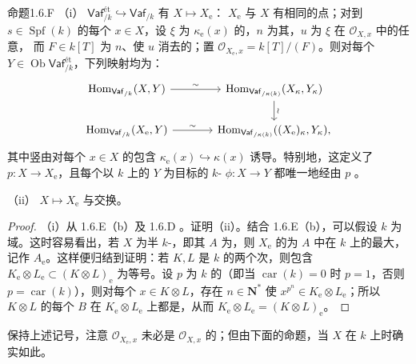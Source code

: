 \begin{SGAresult}{命题}{1.6.F}
（i） $\mathsf{Vaf}^{\text{ét}}_{/k}\hookrightarrow\mathsf{Vaf}_{/k}$ 有 $X\mapsto X_{\mathrm e}$： $X_{\mathrm e}$ 与 $X$ 有相同的点；对到 $s\in\operatorname{Spf}(k)$ 的每个 $x\in X$，设 $\xi$ 为 $\kappa_{\mathrm e}(x)$ 的，$n$ 为其，$u$ 为 $\xi$ 在 $\mathcal O_{X,x}$ 中的任意，
而 $F\in k[T]$ 为 $n$、使 $u$ 消去的；置 $\mathcal O_{X_{\mathrm e},x}=k[T]/(F)$。则对每个 $Y\in\operatorname{Ob}\mathsf{Vaf}^{\text{ét}}_{/k}$，下列映射均为：
\[
\begin{tikzcd}[column sep=large]
 \operatorname{Hom}_{\mathsf{Vaf}_{/k}}(X,Y)\arrow[r,"\sim"]
 &\operatorname{Hom}_{\mathsf{Vaf}_{/\kappa(k)}}(X_\kappa,Y_\kappa)\arrow[d,"\wr"]\\
 \operatorname{Hom}_{\mathsf{Vaf}_{/k}}(X_{\mathrm e},Y)\arrow[r,"\sim"]
 &\operatorname{Hom}_{\mathsf{Vaf}_{/\kappa(k)}}((X_{\mathrm e})_\kappa,Y_\kappa),
\end{tikzcd}
\]
其中竖由对每个 $x\in X$ 的包含 $\kappa_{\mathrm e}(x)\hookrightarrow\kappa(x)$ 诱导。特别地，这定义了 $p:X\to X_{\mathrm e}$，且每个以 $k$ 上的 $Y$ 为目标的 $k$- $\phi:X\to Y$ 都唯一地经由 $p$ 。

（ii） $X\mapsto X_{\mathrm e}$ 与交换。
\end{SGAresult}
\begin{proof}
（i）从 1.6.E（b）及 1.6.D 。证明（ii）。结合 1.6.E（b），可以假设 $k$ 为域。这时容易看出，若 $X$ 为半 $k$-，即其 $A$ 为，则 $X_{\mathrm e}$ 的为 $A$ 中在 $k$ 上的最大，记作 $A_{\mathrm e}$。这样便归结到证明：若 $K,L$ 是 $k$ 的两个次，则包含 $K_{\mathrm e}\otimes L_{\mathrm e}\subset(K\otimes L)_{\mathrm e}$ 为等号。设 $p$ 为 $k$ 的（即当 $\operatorname{car}(k)=0$ 时 $p=1$，否则 $p=\operatorname{car}(k)$），则对每个 $x\in K\otimes L$，存在 $n\in\mathbf N^*$ 使 $x^{p^n}\in K_{\mathrm e}\otimes L_{\mathrm e}$；所以 $K\otimes L$ 的每个 $B$ 在 $K_{\mathrm e}\otimes L_{\mathrm e}$ 上都是，从而 $K_{\mathrm e}\otimes L_{\mathrm e}=(K\otimes L)_{\mathrm e}$。
\end{proof}
保持上述记号，注意 $\mathcal O_{X_{\mathrm e},x}$ 未必是 $\mathcal O_{X,x}$ 的；但由下面的命题，当 $X$ 在 $k$ 上时确实如此。

